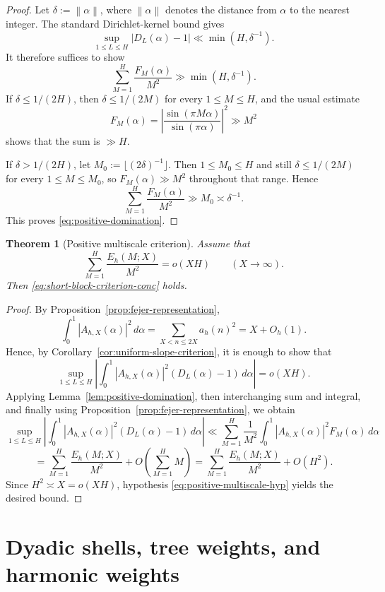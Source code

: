 \documentclass[11pt]{scrartcl}
\numberwithin{equation}{section}
\newtheorem{theorem}{Theorem}[section]
\theoremstyle{definition}
\newcommand{\1}{\mathbf 1}
\newcommand{\abs}[1]{\left|#1\right|}
\newcommand{\norm}[1]{\left\|#1\right\|}
\begin{document}
\begin{proof}
Let $\delta:=\norm{\alpha}$, where $\norm{\alpha}$ denotes the distance from $\alpha$ to the nearest integer. The standard Dirichlet-kernel bound gives
\[
\sup_{1\le L\le H}\abs{D_L(\alpha)-1}\ll \min(H,\delta^{-1}).
\]
It therefore suffices to show
\[
\sum_{M=1}^H \frac{F_M(\alpha)}{M^2}\gg \min(H,\delta^{-1}).
\]
If $\delta\le 1/(2H)$, then $\delta\le 1/(2M)$ for every $1\le M\le H$, and the usual estimate
\[
F_M(\alpha)=\left|\frac{\sin(\pi M\alpha)}{\sin(\pi\alpha)}\right|^2\gg M^2
\]
shows that the sum is $\gg H$.

If $\delta>1/(2H)$, let $M_0:=\lfloor (2\delta)^{-1}\rfloor$. Then $1\le M_0\le H$ and still $\delta\le 1/(2M)$ for every $1\le M\le M_0$, so $F_M(\alpha)\gg M^2$ throughout that range. Hence
\[
\sum_{M=1}^H \frac{F_M(\alpha)}{M^2}\gg M_0\asymp \delta^{-1}.
\]
This proves \eqref{eq:positive-domination}.
\end{proof}

\begin{theorem}[Positive multiscale criterion]
\label{thm:positive-multiscale-criterion}
Assume that
\begin{equation}
\label{eq:positive-multiscale-hyp}
\sum_{M=1}^{H}\frac{E_h(M;X)}{M^2}=o(XH)
\qquad (X\to\infty).
\end{equation}
Then \eqref{eq:short-block-criterion-conc} holds.
\end{theorem}

\begin{proof}
By Proposition~\ref{prop:fejer-representation},
\[
\int_0^1 \abs{A_{h,X}(\alpha)}^2\,d\alpha
=\sum_{X<n\le 2X}a_h(n)^2
=X+O_h(1).
\]
Hence, by Corollary~\ref{cor:uniform-slope-criterion}, it is enough to show that
\[
\sup_{1\le L\le H}\left|\int_0^1 \abs{A_{h,X}(\alpha)}^2(D_L(\alpha)-1)\,d\alpha\right|=o(XH).
\]
Applying Lemma~\ref{lem:positive-domination}, then interchanging sum and integral, and finally using Proposition~\ref{prop:fejer-representation}, we obtain
\[
\sup_{1\le L\le H}\left|\int_0^1 \abs{A_{h,X}(\alpha)}^2(D_L(\alpha)-1)\,d\alpha\right|
\ll
\sum_{M=1}^{H}\frac{1}{M^2}\int_0^1 \abs{A_{h,X}(\alpha)}^2F_M(\alpha)\,d\alpha
\]
\[
=
\sum_{M=1}^{H}\frac{E_h(M;X)}{M^2}+O\!\left(\sum_{M=1}^{H}M\right)
=
\sum_{M=1}^{H}\frac{E_h(M;X)}{M^2}+O(H^2).
\]
Since $H^2\asymp X=o(XH)$, hypothesis \eqref{eq:positive-multiscale-hyp} yields the desired bound.
\end{proof}

\section{Dyadic shells, tree weights, and harmonic weights}
\label{sec:dyadic-shells}
\end{document}
